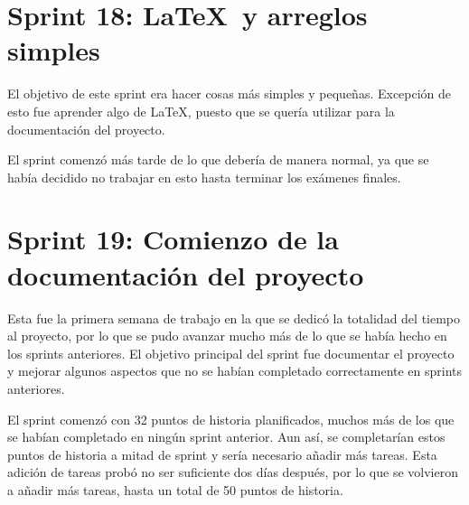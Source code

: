 

\section{Sprint 18: \LaTeX\ y arreglos simples}
\label{anexo3:sec:sprint18}

El objetivo de este sprint era hacer cosas más simples y pequeñas. Excepción de esto fue aprender
algo de \LaTeX, puesto que se quería utilizar para la documentación del proyecto.

El sprint comenzó más tarde de lo que debería de manera normal, ya que se había decidido no
trabajar en esto hasta terminar los exámenes finales.




\section{Sprint 19: Comienzo de la documentación del proyecto}
\label{anexo3:sec:sprint19}

Esta fue la primera semana de trabajo en la que se dedicó la totalidad del tiempo al proyecto, por
lo que se pudo avanzar mucho más de lo que se había hecho en los sprints anteriores. El objetivo
principal del sprint fue documentar el proyecto y mejorar algunos aspectos que no se habían
completado correctamente en sprints anteriores.

El sprint comenzó con 32 puntos de historia planificados, muchos más de los que se habían
completado en ningún sprint anterior. Aun así, se completarían estos puntos de historia a mitad
de sprint y sería necesario añadir más tareas. Esta adición de tareas probó no ser suficiente
dos días después, por lo que se volvieron a añadir más tareas, hasta un total de 50 puntos de
historia.

